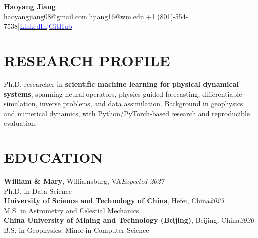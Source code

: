 \documentclass[11pt,letterpaper]{article}
\newcommand{\link}[2]{\href{#1}{\textcolor{blue}{#2}}}
\begin{document}
\begin{center}
{\Large\bfseries Haoyang Jiang}\\[2pt]
{\small\href{mailto:haoyangjiang08@gmail.com}{haoyangjiang08@gmail.com}\enspace|\enspace\href{mailto:hjiang16@wm.edu}{hjiang16@wm.edu}\enspace|\enspace +1 (801)-554-7538\enspace|\enspace\link{https://www.linkedin.com/in/haoyang-jiang-7573872a4/}{LinkedIn}\enspace|\enspace\link{https://github.com/HaoyangJiang-WM}{GitHub}}
\end{center}
\vspace{-7pt}
\section*{RESEARCH PROFILE}
Ph.D. researcher in \textbf{scientific machine learning for physical dynamical systems}, spanning neural operators, physics-guided forecasting, differentiable simulation, inverse problems, and data assimilation. Background in geophysics and numerical dynamics, with Python/PyTorch-based research and reproducible evaluation.

\section*{EDUCATION}
\textbf{William \& Mary}, Williamsburg, VA\hfill\textit{Expected 2027}\\
Ph.D. in Data Science\\[3pt]
\textbf{University of Science and Technology of China}, Hefei, China\hfill\textit{2023}\\
M.S. in Astrometry and Celestial Mechanics\\[3pt]
\textbf{China University of Mining and Technology (Beijing)}, Beijing, China\hfill\textit{2020}\\
B.S. in Geophysics; Minor in Computer Science
\end{document}
